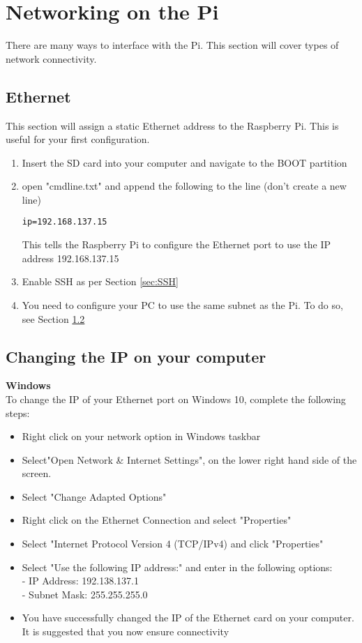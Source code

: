 \section{Networking on the Pi}
\label{app:NetworkingOnThePi}
There are many ways to interface with the Pi. This section will cover types of network connectivity.

\subsection{Ethernet}
\label{sec:Connectivity-Ethernet}
This section will assign a static Ethernet address to the Raspberry Pi. This is useful for your first configuration.
\begin{enumerate}
    \item Insert the SD card into your computer and navigate to the BOOT partition
    \item open "cmdline.txt" and append the following to the line (don't create a new line)
        \begin{verbatim}ip=192.168.137.15\end{verbatim} 
        This tells the Raspberry Pi to configure the Ethernet port to use the IP address 192.168.137.15
    \item Enable SSH as per Section \ref{sec:SSH}
    \item You need to configure your PC to use the same subnet as the Pi. To do so, see Section \ref{sec:Connectivity-ChangeComputerIP}
\end{enumerate}

\subsection{Changing the IP on your computer}
\label{sec:Connectivity-ChangeComputerIP}
\textbf{Windows}\\
To change the IP of your Ethernet port on Windows 10, complete the following steps:
\begin{itemize}
    \item Right click on your network option in Windows taskbar
    \item Select"Open Network \& Internet Settings", on the lower right hand side of the screen.
    \item Select "Change Adapted Options"
    \item Right click on the Ethernet Connection and select "Properties"
    \item Select "Internet Protocol Version 4 (TCP/IPv4) and click "Properties"
    \item Select "Use the following IP address:" and enter in the following options:\\
            - IP Address: 192.138.137.1\\
            - Subnet Mask: 255.255.255.0
    \item You have successfully changed the IP of the Ethernet card on your computer. It is suggested that you now ensure connectivity
\end{itemize}

